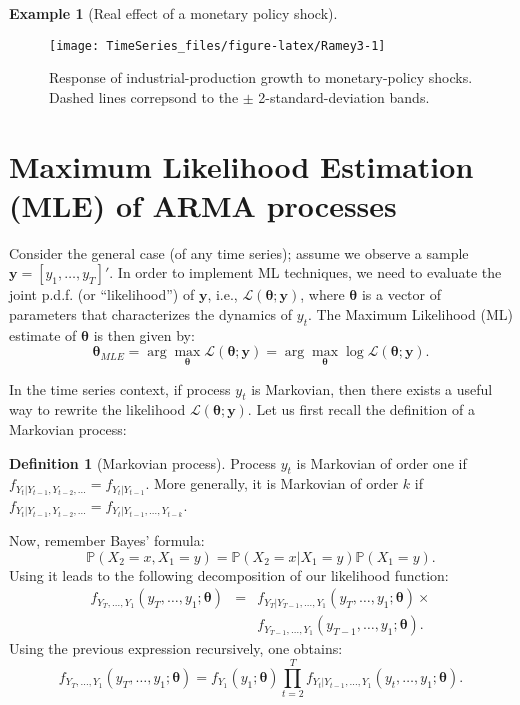 \documentclass[
  12pt,
]{book}
\theoremstyle{definition}
\newtheorem{definition}{Definition}[chapter]
\theoremstyle{definition}
\newtheorem{example}{Example}[chapter]
\theoremstyle{definition}
\theoremstyle{definition}
\theoremstyle{remark}
\begin{document}
\begin{example}[Real effect of a monetary policy shock]
\begin{figure}
\texttt{[image: TimeSeries\_files/figure-latex/Ramey3-1]} \caption{Response of industrial-production growth to monetary-policy shocks. Dashed lines correpsond to the $\pm$  2-standard-deviation bands.}\label{fig:Ramey3}
\end{figure}

\end{example}

\hypertarget{estimARMA}{%
\section{Maximum Likelihood Estimation (MLE) of ARMA processes}\label{estimARMA}}

Consider the general case (of any time series); assume we observe a sample \(\mathbf{y}=[y_1,\dots,y_T]'\). In order to implement ML techniques, we need to evaluate the joint p.d.f. (or ``likelihood'') of \(\mathbf{y}\), i.e., \(\mathcal{L}(\boldsymbol\theta;\mathbf{y})\), where \(\boldsymbol\theta\) is a vector of parameters that characterizes the dynamics of \(y_t\). The Maximum Likelihood (ML) estimate of \(\boldsymbol\theta\) is then given by:
\[
\boxed{\boldsymbol\theta_{MLE} = \arg \max_{\boldsymbol\theta} \mathcal{L}(\boldsymbol\theta;\mathbf{y})  = \arg \max_{\boldsymbol\theta} \log \mathcal{L}(\boldsymbol\theta;\mathbf{y}).}
\]

In the time series context, if process \(y_t\) is Markovian, then there exists a useful way to rewrite the likelihood \(\mathcal{L}(\boldsymbol\theta;\mathbf{y})\). Let us first recall the definition of a Markovian process:

\begin{definition}[Markovian process]
\protect\hypertarget{def:Markov}{}\label{def:Markov}Process \(y_t\) is Markovian of order one if \(f_{Y_t|Y_{t-1},Y_{t-2},\dots} = f_{Y_t|Y_{t-1}}\). More generally, it is Markovian of order \(k\) if \(f_{Y_t|Y_{t-1},Y_{t-2},\dots} = f_{Y_t|Y_{t-1},\dots,Y_{t-k}}\).
\end{definition}

Now, remember Bayes' formula:
\[
\mathbb{P}(X_2=x,X_1=y) = \mathbb{P}(X_2=x|X_1=y)\mathbb{P}(X_1=y).
\]
Using it leads to the following decomposition of our likelihood function:
\begin{eqnarray*}
f_{Y_T,\dots,Y_1}(y_T,\dots,y_1;\boldsymbol\theta) &=&f_{Y_T|Y_{T-1},\dots,Y_1}(y_T,\dots,y_1;\boldsymbol\theta) \times \\
&& f_{Y_{T-1},\dots,Y_1}(y_{T-1},\dots,y_1;\boldsymbol\theta).
\end{eqnarray*}
Using the previous expression recursively, one obtains:
\begin{equation}
f_{Y_T,\dots,Y_1}(y_T,\dots,y_1;\boldsymbol\theta) = f_{Y_1}(y_1;\boldsymbol\theta) \prod_{t=2}^{T} f_{Y_t|Y_{t-1},\dots,Y_1}(y_t,\dots,y_1;\boldsymbol\theta).\label{eq:recursMLE}
\end{equation}
\end{document}
